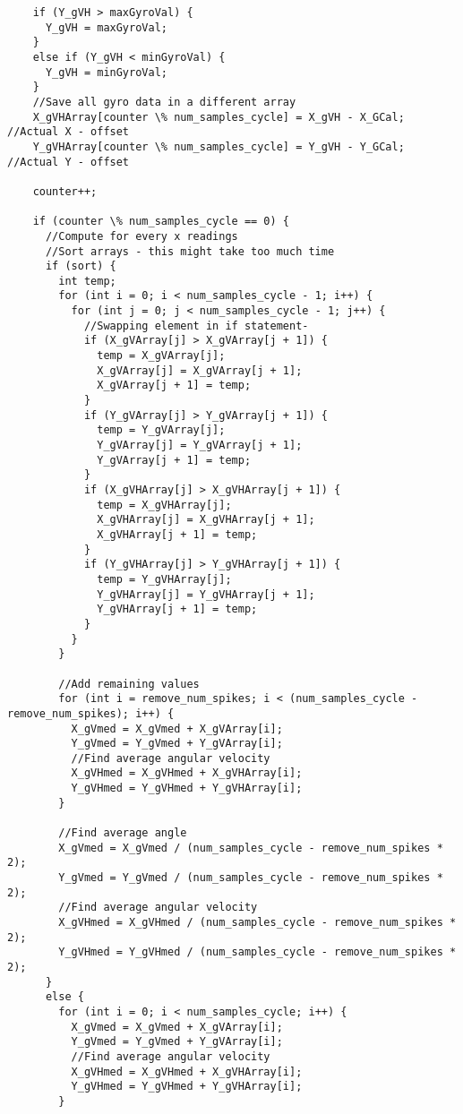 \begin{lstlisting}
    if (Y_gVH > maxGyroVal) {
      Y_gVH = maxGyroVal;
    }
    else if (Y_gVH < minGyroVal) {
      Y_gVH = minGyroVal;
    }
    //Save all gyro data in a different array
    X_gVHArray[counter \% num_samples_cycle] = X_gVH - X_GCal; //Actual X - offset
    Y_gVHArray[counter \% num_samples_cycle] = Y_gVH - Y_GCal; //Actual Y - offset
 
    counter++;
 
    if (counter \% num_samples_cycle == 0) {
      //Compute for every x readings
      //Sort arrays - this might take too much time
      if (sort) {
        int temp;
        for (int i = 0; i < num_samples_cycle - 1; i++) {
          for (int j = 0; j < num_samples_cycle - 1; j++) {
            //Swapping element in if statement-
            if (X_gVArray[j] > X_gVArray[j + 1]) {
              temp = X_gVArray[j];
              X_gVArray[j] = X_gVArray[j + 1];
              X_gVArray[j + 1] = temp;
            }
            if (Y_gVArray[j] > Y_gVArray[j + 1]) {
              temp = Y_gVArray[j];
              Y_gVArray[j] = Y_gVArray[j + 1];
              Y_gVArray[j + 1] = temp;
            }
            if (X_gVHArray[j] > X_gVHArray[j + 1]) {
              temp = X_gVHArray[j];
              X_gVHArray[j] = X_gVHArray[j + 1];
              X_gVHArray[j + 1] = temp;
            }
            if (Y_gVHArray[j] > Y_gVHArray[j + 1]) {
              temp = Y_gVHArray[j];
              Y_gVHArray[j] = Y_gVHArray[j + 1];
              Y_gVHArray[j + 1] = temp;
            }
          }
        }
 
        //Add remaining values
        for (int i = remove_num_spikes; i < (num_samples_cycle - remove_num_spikes); i++) {
          X_gVmed = X_gVmed + X_gVArray[i];
          Y_gVmed = Y_gVmed + Y_gVArray[i];
          //Find average angular velocity
          X_gVHmed = X_gVHmed + X_gVHArray[i];
          Y_gVHmed = Y_gVHmed + Y_gVHArray[i];
        }
 
        //Find average angle
        X_gVmed = X_gVmed / (num_samples_cycle - remove_num_spikes * 2);
        Y_gVmed = Y_gVmed / (num_samples_cycle - remove_num_spikes * 2);
        //Find average angular velocity
        X_gVHmed = X_gVHmed / (num_samples_cycle - remove_num_spikes * 2);
        Y_gVHmed = Y_gVHmed / (num_samples_cycle - remove_num_spikes * 2);
      }
      else {
        for (int i = 0; i < num_samples_cycle; i++) {
          X_gVmed = X_gVmed + X_gVArray[i];
          Y_gVmed = Y_gVmed + Y_gVArray[i];
          //Find average angular velocity
          X_gVHmed = X_gVHmed + X_gVHArray[i];
          Y_gVHmed = Y_gVHmed + Y_gVHArray[i];
        }
 

\end{lstlisting}
